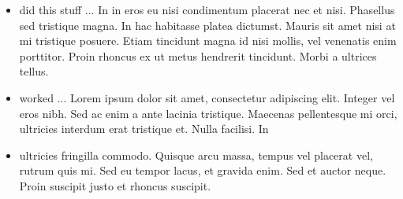 \documentclass[10pt,a4paper]{altacv}
\begin{document}
\begin{itemize}
\item did this stuff ... In in eros eu nisi condimentum placerat nec et nisi. Phasellus sed tristique magna. In hac habitasse platea dictumst. Mauris sit amet nisi at mi tristique posuere. Etiam tincidunt magna id nisi mollis, vel venenatis enim porttitor. Proin rhoncus ex ut metus hendrerit tincidunt. Morbi a ultrices tellus. 
\end{itemize}

\begin{itemize}
\item worked ... Lorem ipsum dolor sit amet, consectetur adipiscing elit. Integer vel eros nibh. Sed ac enim a ante lacinia tristique. Maecenas pellentesque mi orci, ultricies interdum erat tristique et. Nulla facilisi. In 
\item ultricies fringilla commodo. Quisque arcu massa, tempus vel placerat vel, rutrum quis mi. Sed eu tempor lacus, et gravida enim. Sed et auctor neque. Proin suscipit justo et rhoncus suscipit.


\end{itemize}
\end{document}
